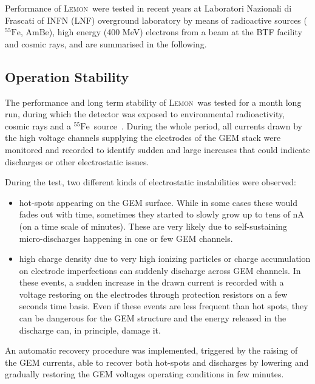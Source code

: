 \documentclass[physics,article,submit,moreauthors,pdftex]{Definitions/mdpi}
\newcommand{\fe}{\ensuremath{^{55}\textrm{Fe}}\xspace}
\newcommand{\ambe}{\ensuremath{\textrm{Am} \textrm{Be}}\xspace}
\newcommand{\lemon}{{\textsc{Lemon}}\xspace}
\begin{document}
Performance of \lemon\ were tested in recent years at Laboratori Nazionali di Frascati of INFN (LNF) overground laboratory by means of radioactive sources (\fe, \ambe), high energy (400 MeV) electrons from a beam at the BTF facility \cite{bib:btf1,bib:btf2} and cosmic rays, and are summarised in the following.

\subsection{Operation Stability}\label{sec:stability}

The performance and long term stability of \lemon\ was
tested for a month long run, during which the detector was exposed to environmental radioactivity, cosmic rays and a \fe~source~\cite{bib:fe55New}. During the whole period, all currents drawn by the high voltage channels supplying the electrodes of the GEM stack were monitored and recorded to identify sudden and large increases that could indicate discharges or other electrostatic issues.

During the test, two different kinds of electrostatic instabilities were observed:

\begin{itemize}
    \item hot-spots appearing on the GEM surface. While in some  cases these would fades out with time, sometimes they started to slowly grow up to tens of nA (on a time scale of minutes). These are very likely due to self-sustaining micro-discharges happening in one or few GEM channels. 
    
    \item high charge density due to very high ionizing particles or charge accumulation on electrode imperfections can suddenly discharge across GEM channels. In these events, a sudden increase in the drawn current is recorded with a voltage restoring on the electrodes through protection resistors on a few seconds time basis.  Even if these events are less frequent than hot spots, they can be dangerous for the GEM structure and the energy released in the discharge can, in principle, damage it. 
\end{itemize}

An automatic recovery procedure was implemented, triggered by the raising of the GEM currents, able to recover both hot-spots and discharges by lowering and gradually restoring the GEM voltages operating conditions in few minutes.
\end{document}
